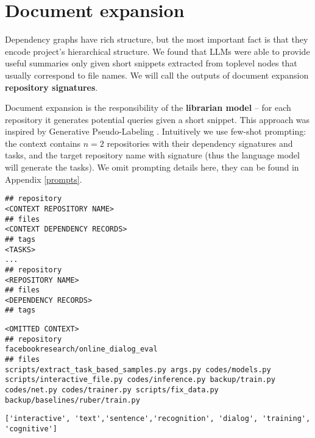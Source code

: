 \section{Document expansion}
\label{approach_document_expansion}
Dependency graphs have rich structure, but the most important fact is that they encode project's hierarchical structure. We found that LLMs were able to provide useful summaries only given short snippets extracted from toplevel nodes that usually correspond to file names. We will call the outputs of document expansion \textbf{repository signatures}.

Document expansion is the responsibility of the \textbf{librarian model} -- for each repository it generates potential queries given a short snippet. This approach was inspired by Generative Pseudo-Labeling \cite{gpl}. Intuitively we use few-shot prompting: the context contains $n=2$ repositories with their dependency signatures and tasks, and the target repository name with signature (thus the language model will generate the tasks). We omit prompting details here, they can be found in Appendix \ref{prompts}.

\begin{samepage}
\begin{lstlisting}[caption=Few-shot prompt format]
## repository
<CONTEXT REPOSITORY NAME>
## files
<CONTEXT DEPENDENCY RECORDS>
## tags
<TASKS>
...
## repository
<REPOSITORY NAME>
## files
<DEPENDENCY RECORDS>
## tags
\end{lstlisting}
\end{samepage}

\begin{samepage}
\begin{lstlisting}[caption=Input repository]
<OMITTED CONTEXT>
## repository
facebookresearch/online_dialog_eval
## files
scripts/extract_task_based_samples.py args.py codes/models.py scripts/interactive_file.py codes/inference.py backup/train.py codes/net.py codes/trainer.py scripts/fix_data.py backup/baselines/ruber/train.py
\end{lstlisting}
\end{samepage}


\begin{samepage}
\begin{lstlisting}[caption=Generated text]
['interactive', 'text','sentence','recognition', 'dialog', 'training', 'cognitive']
\end{lstlisting}
\end{samepage}
